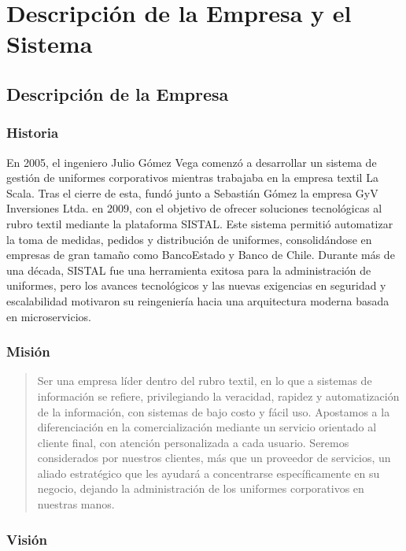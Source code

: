 \chapter{Descripción de la Empresa y el Sistema}

\section{Descripción de la Empresa}

\subsection{Historia}

En 2005, el ingeniero Julio Gómez Vega comenzó a desarrollar un sistema de gestión de uniformes corporativos mientras trabajaba en la empresa textil La Scala. Tras el cierre de esta, fundó junto a Sebastián Gómez la empresa GyV Inversiones Ltda. en 2009, con el objetivo de ofrecer soluciones tecnológicas al rubro textil mediante la plataforma SISTAL.
Este sistema permitió automatizar la toma de medidas, pedidos y distribución de uniformes, consolidándose en empresas de gran tamaño como BancoEstado y Banco de Chile.
Durante más de una década, SISTAL fue una herramienta exitosa para la administración de uniformes, pero los avances tecnológicos y las nuevas exigencias en seguridad y escalabilidad motivaron su reingeniería hacia una arquitectura moderna basada en microservicios.

\subsection{Misión}

\begin{quote}
    Ser una empresa líder dentro del rubro textil, en lo que a sistemas de información se refiere, privilegiando la veracidad, rapidez y automatización de la información, con sistemas de bajo costo y fácil uso. Apostamos a la diferenciación en la comercialización mediante un servicio orientado al cliente final, con atención personalizada a cada usuario. Seremos considerados por nuestros clientes, más que un proveedor de servicios, un aliado estratégico que les ayudará a concentrarse específicamente en su negocio, dejando la administración de los uniformes corporativos en nuestras manos.
\end{quote}

\subsection{Visión}

